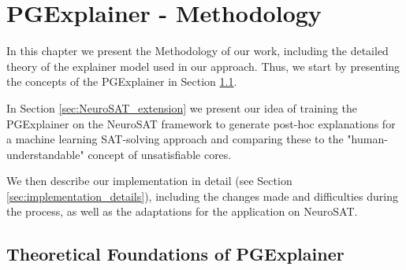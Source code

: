 \chapter{PGExplainer - Methodology}
\label{ch:PGExplainer}


In this chapter we present the Methodology of our work, including the detailed theory of the explainer model used in our approach. Thus, we start by presenting the concepts of the PGExplainer \cite{luo2020parameterized} in Section \ref{sec:TheoryPGE}.

In Section \ref{sec:NeuroSAT_extension} we present our idea of training the PGExplainer on the NeuroSAT framework to generate post-hoc explanations for a machine learning SAT-solving approach and comparing these to the "human-understandable" concept of unsatisfiable cores. 

We then describe our implementation in detail (see Section \ref{sec:implementation_details}), including the changes made and difficulties during the process, as well as the adaptations for the application on NeuroSAT.

\section{Theoretical Foundations of PGExplainer}
\label{sec:TheoryPGE}

